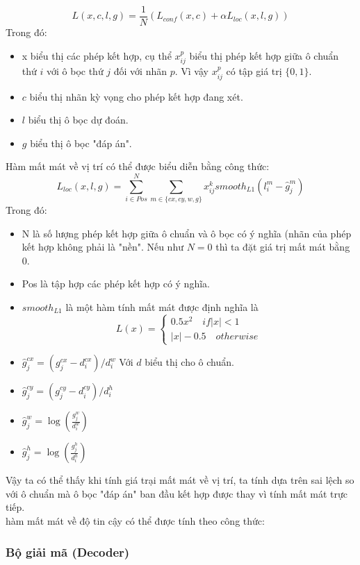 \documentclass[a4paper,12pt]{article}
\begin{document}
	$$ L(x,c,l,g) = \frac{1}{N} (L_{conf}(x,c) + \alpha L_{loc}(x,l,g) ) $$
	Trong đó:
	\begin{itemize}
		\item x biểu thị các phép kết hợp, cụ thể $x^p_{ij}$ biểu thị phép kết hợp giữa ô chuẩn thứ $i$ với ô bọc thứ $j$ đối với nhãn $p$. Vì vậy $x^p_{ij}$ có tập giá trị $\{0, 1\}$.
		\item $c$ biểu thị nhãn kỳ vọng cho phép kết hợp đang xét.
		\item $l$ biểu thị ô bọc dự đoán.
		\item $g$ biểu thị ô bọc "đáp án".
	\end{itemize}
	
	Hàm mất mát về vị trí có thể được biểu diễn bằng công thức:
	$$L_{loc}(x,l,g) = \sum^N_{i \in Pos} \sum_{m \in \{ cx, cy, w, g \}} x^k_{ij} smooth_{L1} (l^m_i - \hat{g}^m_j) $$
	Trong đó:
	\begin{itemize}
		\item N là số lượng phép kết hợp giữa ô chuẩn và ô bọc có ý nghĩa (nhãn của phép kết hợp không phải là "nền". Nếu như $N = 0$ thì ta đặt giá trị mất mát bằng 0.
		\item Pos là tập hợp các phép kết hợp có ý nghĩa.
		\item $smooth_{L1}$ là một hàm tính mất mát được định nghĩa là 
		$$L(x) = \begin{cases} 0.5x^2 \quad if |x| < 1 \\ |x| - 0.5 \quad otherwise \end{cases} $$
		\item $\hat{g}_j^{cx} = (g_j^{cx} - d_i^{cx}) / d^w_i$ Với $d$ biểu thị cho ô chuẩn.
		\item $\hat{g}_j^{cy} = (g_j^{cy} - d_i^{cy}) / d^h_i$
		\item $\hat{g}^w_j = \log \left( \frac{g_j^w}{d_i^w} \right)$
		\item $\hat{g}^h_j = \log \left( \frac{g_j^h}{d_i^h} \right)$
	\end{itemize}
	
	Vậy ta có thể thấy khi tính giá trại mất mát về vị trí, ta tính dựa trên sai lệch so với ô chuẩn mà ô bọc "đáp án" ban đầu kết hợp được thay vì tính mất mát trực tiếp.\\
	
	hàm mất mát về độ tin cậy có thể được tính theo công thức:
	
	\subsubsection{Bộ giải mã (Decoder)}
	
\end{document}
